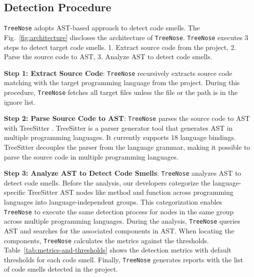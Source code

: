 
\subsection{Detection Procedure}
\label{sec:Detection Procedure}

\texttt{TreeNose} adopts AST-based approach to detect code smells. The Fig.~\ref{fig:architecture} discloses the architecture of \texttt{TreeNose}.
\texttt{TreeNose} executes 3 steps to detect target code smells. 1. Extract source code from the project, 2. Parse the source code to AST, 3. Analyze AST to detect code smells.


\textbf{Step 1: Extract Source Code}: \texttt{TreeNose} recursively extracts source code matching with the target programming language from the project. During this procedure, \texttt{TreeNose} fetches
all target files unless the file or the path is in the ignore list.

\textbf{Step 2: Parse Source Code to AST}: \texttt{TreeNose} parses the source code to AST with TreeSitter \cite{treeSitter}. 
TreeSitter is a parser generator tool that generates AST in multiple programming languages. It currently supports 18 language bindings. 
TreeSitter decouples the parser from the language grammar, making it possible to parse the source code in 
multiple programming languages.

\textbf{Step 3: Analyze AST to Detect Code Smells}: \texttt{TreeNose} analyzes AST to detect code smells.
Before the analysis, our developers categorize the language-specific TreeSitter AST nodes like method and function across programming 
languages into language-independent groups. This categorization enables \texttt{TreeNose} to execute the same detection process 
for nodes in the same group across multiple programming languages.
During the analysis, \texttt{TreeNose} queries AST and searches for the associated components in AST.
When locating the components, \texttt{TreeNose} calculates the metrics against the thresholds.
Table~\ref{tab:metrics-and-thresholds} shows the detection metrics with default thresholds for each code smell.
Finally, \texttt{TreeNose} generates reports with the list of code smells detected in the project.



